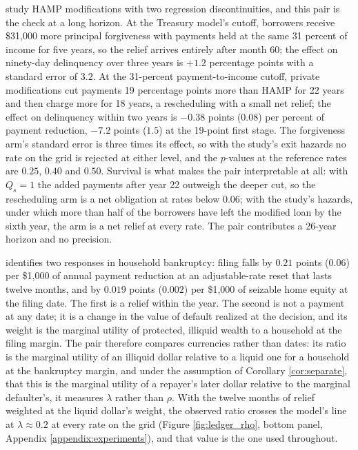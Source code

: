 \citet{ganong_liquidity_2020} study HAMP modifications with two regression discontinuities, and this pair is the check at a long horizon. At the Treasury model's cutoff, borrowers receive \$31,000 more principal forgiveness with payments held at the same 31 percent of income for five years, so the relief arrives entirely after month 60; the effect on ninety-day delinquency over three years is $+1.2$ percentage points with a standard error of $3.2$. At the 31-percent payment-to-income cutoff, private modifications cut payments 19 percentage points more than HAMP for 22 years and then charge more for 18 years, a rescheduling with a small net relief; the effect on delinquency within two years is $-0.38$ points ($0.08$) per percent of payment reduction, $-7.2$ points ($1.5$) at the 19-point first stage. The forgiveness arm's standard error is three times its effect, so with the study's exit hazards no rate on the grid is rejected at either level, and the $p$-values at the reference rates are $0.25$, $0.40$ and $0.50$. Survival is what makes the pair interpretable at all: with $Q_s = 1$ the added payments after year 22 outweigh the deeper cut, so the rescheduling arm is a net obligation at rates below $0.06$; with the study's hazards, under which more than half of the borrowers have left the modified loan by the sixth year, the arm is a net relief at every rate. The pair contributes a 26-year horizon and no precision.

\citet{indarte_moral_2023} identifies two responses in household bankruptcy: filing falls by $0.21$ points ($0.06$) per \$1,000 of annual payment reduction at an adjustable-rate reset that lasts twelve months, and by $0.019$ points ($0.002$) per \$1,000 of seizable home equity at the filing date. The first is a relief within the year. The second is not a payment at any date; it is a change in the value of default realized at the decision, and its weight is the marginal utility of protected, illiquid wealth to a household at the filing margin. The pair therefore compares currencies rather than dates: its ratio is the marginal utility of an illiquid dollar relative to a liquid one for a household at the bankruptcy margin, and under the assumption of Corollary \ref{cor:separate}, that this is the marginal utility of a repayer's later dollar relative to the marginal defaulter's, it measures $\lambda$ rather than $\rho$. With the twelve months of relief weighted at the liquid dollar's weight, the observed ratio crosses the model's line at $\lambda \approx 0.2$ at every rate on the grid (Figure \ref{fig:ledger_rho}, bottom panel, Appendix \ref{appendix:experiments}), and that value is the one used throughout.


